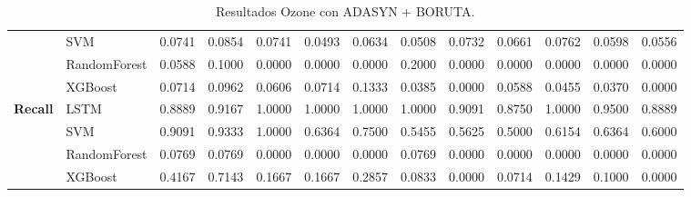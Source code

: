 \begin{table}[h]
\begin{adjustbox}{max width=15cm}
\begin{tabular}{|c|l|r|r|r|r|r|r|r|r|r|r|r|}
			& SVM &  0.0741 &  0.0854 &  0.0741 &  0.0493 &  0.0634 &  0.0508 &  0.0732 &  0.0661 &  0.0762 &  0.0598 &  0.0556 \\
			& RandomForest &  0.0588 &  0.1000 &  0.0000 &  0.0000 &  0.0000 &  0.2000 &  0.0000 &  0.0000 &  0.0000 &  0.0000 &  0.0000 \\
			& XGBoost &  0.0714 &  0.0962 &  0.0606 &  0.0714 &  0.1333 &  0.0385 &  0.0000 &  0.0588 &  0.0455 &  0.0370 &  0.0000 \\
			\hline
			\textbf{Recall} & LSTM &  0.8889 &  0.9167 &  1.0000 &  1.0000 &  1.0000 &  1.0000 &  0.9091 &  0.8750 &  1.0000 &  0.9500 &  0.8889 \\
			& SVM &  0.9091 &  0.9333 &  1.0000 &  0.6364 &  0.7500 &  0.5455 &  0.5625 &  0.5000 &  0.6154 &  0.6364 &  0.6000 \\
			& RandomForest &  0.0769 &  0.0769 &  0.0000 &  0.0000 &  0.0000 &  0.0769 &  0.0000 &  0.0000 &  0.0000 &  0.0000 &  0.0000 \\
			& XGBoost &  0.4167 &  0.7143 &  0.1667 &  0.1667 &  0.2857 &  0.0833 &  0.0000 &  0.0714 &  0.1429 &  0.1000 &  0.0000 \\
			\hline
		\end{tabular}
	\end{adjustbox}
	\caption{Resultados Ozone con ADASYN + BORUTA.}
	\label{tab:Ozone_ADASYN_BORUTA}
\end{table}
\newpage
